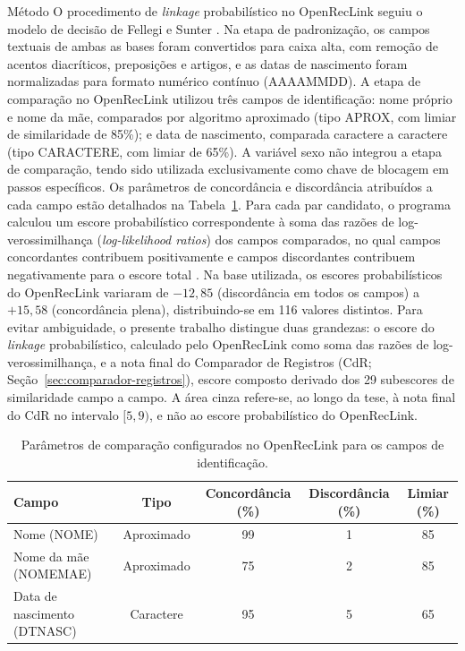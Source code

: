 \begin{chapter}{Método}
O procedimento de \textit{linkage} probabilístico no OpenRecLink seguiu o modelo de decisão de Fellegi e Sunter \citeyearpar{Fellegi1969theory}. Na etapa de padronização, os campos textuais de ambas as bases foram convertidos para caixa alta, com remoção de acentos diacríticos, preposições e artigos, e as datas de nascimento foram normalizadas para formato numérico contínuo (AAAAMMDD). A etapa de comparação no OpenRecLink utilizou três campos de identificação: nome próprio e nome da mãe, comparados por algoritmo aproximado (tipo APROX, com limiar de similaridade de 85\%); e data de nascimento, comparada caractere a caractere (tipo CARACTERE, com limiar de 65\%). A variável sexo não integrou a etapa de comparação, tendo sido utilizada exclusivamente como chave de blocagem em passos específicos. Os parâmetros de concordância e discordância atribuídos a cada campo estão detalhados na Tabela~\ref{tab:parametros-orl}. Para cada par candidato, o programa calculou um escore probabilístico correspondente à soma das razões de log-verossimilhança (\textit{log-likelihood ratios}) dos campos comparados, no qual campos concordantes contribuem positivamente e campos discordantes contribuem negativamente para o escore total \cite{Fellegi1969theory, Christen2012book}. Na base utilizada, os escores probabilísticos do OpenRecLink variaram de $-12{,}85$ (discordância em todos os campos) a $+15{,}58$ (concordância plena), distribuindo-se em 116 valores distintos. Para evitar ambiguidade, o presente trabalho distingue duas grandezas: o escore do \textit{linkage} probabilístico, calculado pelo OpenRecLink como soma das razões de log-verossimilhança, e a nota final do Comparador de Registros (CdR; Seção~\ref{sec:comparador-registros}), escore composto derivado dos 29 subescores de similaridade campo a campo. A área cinza refere-se, ao longo da tese, à nota final do CdR no intervalo $[5,9)$, e não ao escore probabilístico do OpenRecLink.

\begin{table}[!ht]
\centering
\caption{Parâmetros de comparação configurados no OpenRecLink para os campos de identificação.}
\label{tab:parametros-orl}
\begin{tabular}{lcccc}
\hline
\textbf{Campo} & \textbf{Tipo} & \textbf{Concordância (\%)} & \textbf{Discordância (\%)} & \textbf{Limiar (\%)} \\
\hline
Nome (NOME) & Aproximado & 99 & 1 & 85 \\
Nome da mãe (NOMEMAE) & Aproximado & 75 & 2 & 85 \\
Data de nascimento (DTNASC) & Caractere & 95 & 5 & 65 \\
\hline
\end{tabular}
\end{table}


\end{chapter}
